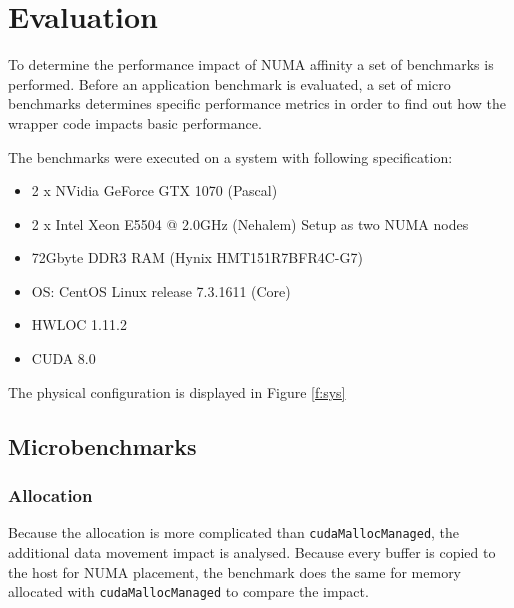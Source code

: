\chapter{Evaluation}\label{c:eval}
To determine the performance impact of NUMA affinity a set of benchmarks is performed. Before an application benchmark is evaluated, a set of micro benchmarks determines specific performance metrics in order to find out how the wrapper code impacts basic performance.

The benchmarks were executed on a system with following specification:
\begin{itemize}
	\item 2 x NVidia GeForce GTX 1070 (Pascal)
	\item 2 x Intel Xeon E5504 @ 2.0GHz (Nehalem) \newline Setup as two NUMA nodes
	\item 72Gbyte DDR3 RAM (Hynix HMT151R7BFR4C-G7)
	\item OS: CentOS Linux release 7.3.1611 (Core)
	\item HWLOC 1.11.2
	\item CUDA 8.0
\end{itemize}
The physical configuration is displayed in Figure \ref{f:sys}

\section{Microbenchmarks}
\subsection{Allocation}
Because the allocation is more complicated than \verb|cudaMallocManaged|, the additional data movement
impact is analysed. Because every buffer is copied to the host for NUMA placement, the benchmark does the same
for memory allocated with \verb|cudaMallocManaged| to compare the impact.

